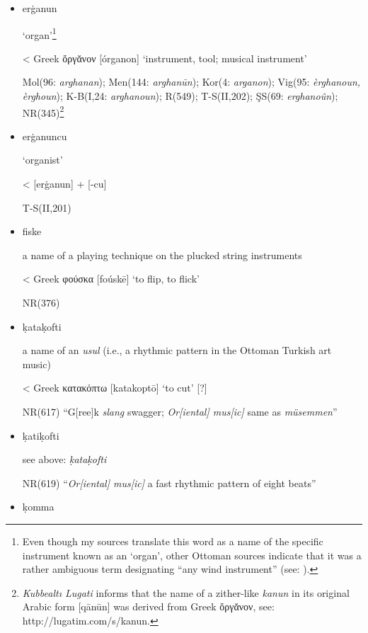 \documentclass[output=paper,colorlinks,citecolor=brown,arabicfont,chinesefont]{langscibook}
\begin{document}
\begin{itemize}
    \item[(1)] erġanun {}
    
    ‘organ’\footnote{Even though my sources translate this word as a name of the specific instrument known as an ‘organ’, other Ottoman sources indicate that it was a rather ambiguous term designating “any wind instrument” (see: \citealt[3]{Farmer1931}).}
    
    < Greek ὄργᾰνον [órganon] ‘instrument, tool; musical instrument’

    Mol(96: \emph{arghanan}); Men(144: \emph{arghanūn}); Kor(4: \emph{arganon}); Vig(95: \emph{èrghanoun, èrghoun}); K-B(I,24: \emph{arghanoun}); R(549); T-S(II,202); ŞS(69: \emph{erghanoûn}); NR(345)\footnote{\emph{Kubbealtı Lugati} informs that the name of a zither-like \emph{kanun} in its original Arabic form {} [qānūn] was derived from Greek ὄργᾰνον, see: http://lugatim.com/s/kanun.}

    \item[(2)] erġanuncu {}

    ‘organist’

    < {} [erġanun] + {} [-cu]

    T-S(II,201)
    
    \item[(3)] fiske {}

    a name of a playing technique on the plucked string instruments

    < Greek φούσκα [foúskē] ‘to flip, to flick’

    NR(376)
    
    \item[(4)] ḳataḳofti {}

    a name of an \emph{usul} (i.e., a rhythmic pattern in the Ottoman Turkish art music)

    < Greek κατακόπτω [katakoptō] ‘to cut’ [?]

    NR(617) “G[ree]k \emph{slang} swagger; \emph{Or[iental] mus[ic]} same as \emph{müsemmen}”
    
    \item[(5)] ḳatiḳofti {}

    see above: \emph{ḳataḳofti}

    NR(619) “\emph{Or[iental] mus[ic]} a fast rhythmic pattern of eight beats”
    
    \item[(6)] ḳomma {}


\end{itemize}
\end{document}
